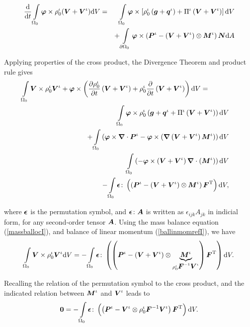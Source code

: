 \begin{eqnarray}
\frac{\mathrm{d}}{\mathrm{d}t} \int\limits_{\Omega_0} \mbox{\boldmath$\varphi$}
\times \rho^\iota_0(\mbox{\boldmath$ V$}+\mbox{\boldmath$ V$}^\iota)\mathrm{d}V &=&
\int\limits_{\Omega_0}\mbox{\boldmath$\varphi$}\times\left[\rho^\iota_0\left(\mbox{\boldmath$ g$}+\mbox{\boldmath$ q$}^\iota\right)+\Pi^\iota\left(\mbox{\boldmath$ V$}+\mbox{\boldmath$ V$}^\iota\right)\right]\mathrm{d}V\nonumber\\
& &+
\int\limits_{\partial\Omega_0}\mbox{\boldmath$\varphi$}\times\left(\mbox{\boldmath$ P$}^\iota-\left(\mbox{\boldmath$ V$}+\mbox{\boldmath$ V$}^\iota\right)\otimes\mbox{\boldmath$ M$}^\iota\right)\mbox{\boldmath$ N$}
\mathrm{d}A
\end{eqnarray}

\noindent Applying properties of the cross product, the Divergence
Theorem and product rule gives
\begin{eqnarray}
\int\limits_{\Omega_0}\mbox{\boldmath$ V$}\times\rho^\iota_0\mbox{\boldmath$ V$}^\iota +
\mbox{\boldmath$\varphi$}\times \left(\frac{\partial\rho^\iota_0}{\partial
t}\left(\mbox{\boldmath$ V$}+\mbox{\boldmath$ V$}^\iota\right)+ \rho^\iota_0\frac{\partial}{\partial
t}\left(\mbox{\boldmath$ V$}+\mbox{\boldmath$ V$}^\iota\right)\right)\mathrm{d}V =\qquad\quad& &\nonumber\\
\int\limits_{\Omega_0}\mbox{\boldmath$\varphi$}\times\rho^\iota_0\left(\mbox{\boldmath$ g$}+\mbox{\boldmath$ q$}^\iota+\Pi^\iota\left(\mbox{\boldmath$ V$}+\mbox{\boldmath$ V$}^\iota\right)\right)\mathrm{d}V& &\nonumber\\
 +
\int\limits_{\Omega_0}\left(\mbox{\boldmath$\varphi$}\times\mbox{\boldmath$\nabla$}\cdot\mbox{\boldmath$ P$}^\iota-\mbox{\boldmath$\varphi$}\times\left(\mbox{\boldmath$\nabla$}\left(\mbox{\boldmath$ V$}+\mbox{\boldmath$ V$}^\iota\right)\mbox{\boldmath$ M$}^\iota\right)\right)\mathrm{d}V
& &\nonumber\\
\int\limits_{\Omega_0}\left(-\mbox{\boldmath$\varphi$}\times\left(\mbox{\boldmath$ V$}+\mbox{\boldmath$ V$}^\iota\right)\mbox{\boldmath$\nabla$}\cdot\left(\mbox{\boldmath$ M$}^\iota\right)\right)
\mathrm{d}V & &\nonumber\\
-
\int\limits_{\Omega_0}\mbox{\boldmath$\epsilon$}\colon\left(\left(\mbox{\boldmath$ P$}^\iota-\left(\mbox{\boldmath$ V$}+\mbox{\boldmath$ V$}^\iota\right)\otimes\mbox{\boldmath$ M$}^\iota\right)\mbox{\boldmath$ F$}^\mathrm{T}\right)\mathrm{d}V,
\end{eqnarray}

\noindent where $\mbox{\boldmath$\epsilon$}$ is the permutation symbol, and
$\mbox{\boldmath$\epsilon$}\colon\mbox{\boldmath$ A$}$ is written as $\epsilon_{ijk}A_{jk}$ in
indicial form, for any second-order tensor $\mbox{\boldmath$ A$}$. Using the mass
balance equation (\ref{massballocI}), and balance of linear
momentum (\ref{ballinmomrefI}), we have
\begin{displaymath}
\int\limits_{\Omega_0}\mbox{\boldmath$ V$}\times\rho^\iota_0\mbox{\boldmath$ V$}^\iota\mathrm{d}V =
-\int\limits_{\Omega_0}\mbox{\boldmath$\epsilon$}\colon\left(\left(\mbox{\boldmath$ P$}^\iota-\left(\mbox{\boldmath$ V$}+\mbox{\boldmath$ V$}^\iota\right)\otimes\underbrace{\mbox{\boldmath$ M$}^\iota}_{\rho_0^\iota\mbox{\boldmath$ F$}^{-1}\mbox{\boldmath$ V$}^\iota}\right)\mbox{\boldmath$ F$}^\mathrm{T}\right)\mathrm{d}V.
\end{displaymath}

\noindent Recalling the relation of the permutation symbol to the
cross product, and the indicated relation between $\mbox{\boldmath$ M$}^\iota$ and
$\mbox{\boldmath$ V$}^\iota$ leads to
\begin{equation}
{\bf 0} =
-\int\limits_{\Omega_0}\mbox{\boldmath$\epsilon$}\colon\left(\left(\mbox{\boldmath$ P$}^\iota-\mbox{\boldmath$ V$}^\iota\otimes\rho_0^\iota\mbox{\boldmath$ F$}^{-1}\mbox{\boldmath$ V$}^\iota\right)\mbox{\boldmath$ F$}^\mathrm{T}\right)\mathrm{d}V.
\end{equation}

